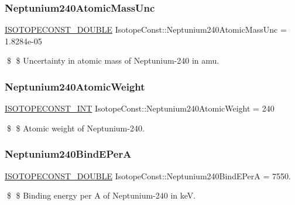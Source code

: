 \subsubsection{\texorpdfstring{Neptunium240\+Atomic\+Mass\+Unc}{Neptunium240AtomicMassUnc}}
{\footnotesize\ttfamily \mbox{\hyperlink{group___isotope_const-_macros_ga8f45a7272ce02c0b4c65c44636ed719a}{I\+S\+O\+T\+O\+P\+E\+C\+O\+N\+S\+T\+\_\+\+D\+O\+U\+B\+LE}} Isotope\+Const\+::\+Neptunium240\+Atomic\+Mass\+Unc = 1.\+8284e-\/05}

\$ \$ Uncertainty in atomic mass of Neptunium-\/240 in amu. \mbox{\label{group___isotope_const-_neptunium-_np240_ga3821a9620485f455f4bb7df58e773d1a}} 
\subsubsection{\texorpdfstring{Neptunium240\+Atomic\+Weight}{Neptunium240AtomicWeight}}
{\footnotesize\ttfamily \mbox{\hyperlink{group___isotope_const-_macros_ga5f18360b3e99483a35c32d789e62621c}{I\+S\+O\+T\+O\+P\+E\+C\+O\+N\+S\+T\+\_\+\+I\+NT}} Isotope\+Const\+::\+Neptunium240\+Atomic\+Weight = 240}

\$ \$ Atomic weight of Neptunium-\/240. \mbox{\label{group___isotope_const-_neptunium-_np240_ga987325b04fc0116d76f046cb5f13b9a9}} 
\subsubsection{\texorpdfstring{Neptunium240\+Bind\+E\+PerA}{Neptunium240BindEPerA}}
{\footnotesize\ttfamily \mbox{\hyperlink{group___isotope_const-_macros_ga8f45a7272ce02c0b4c65c44636ed719a}{I\+S\+O\+T\+O\+P\+E\+C\+O\+N\+S\+T\+\_\+\+D\+O\+U\+B\+LE}} Isotope\+Const\+::\+Neptunium240\+Bind\+E\+PerA = 7550.}

\$ \$ Binding energy per A of Neptunium-\/240 in keV. \mbox{\label{group___isotope_const-_neptunium-_np240_ga6d70cfb3b4dc919c7159a5d9ccb43141}} 
